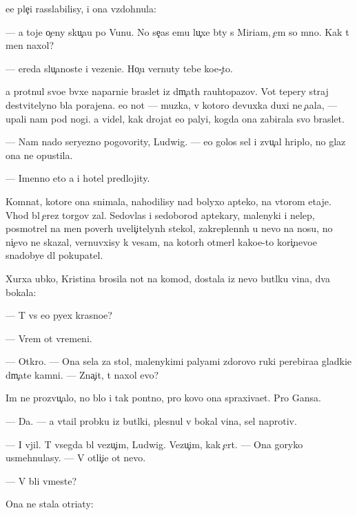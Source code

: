 \documentclass[10pt]{book}
\begin{document}
{\Y}ee ple{\c}i rasslabilisy, i ona vzdohnula:

— {\Y}a toje o{\c}eny sku{\c}a{\y}u po V{\y}unu. No se{\y}{\c}as {\y}emu lu{\c}xe b{\yi}ty s Miriam, {\c}em so mno{\y}. Kak t{\yi} men{\ia} naxol?

— {\C}ereda slu{\c}a{\y}noste{\y} i vezeni{\y}e. Ho{\c}u vernuty tebe ko{\y}e-{\c}to.

{\Y}a prot{\ia}nul svo{\y}e{\y} b{\yi}vxe{\y} naparni{\q}e braslet iz d{\yi}m{\c}at{\yi}h rauhtopazov. Vot tepery straj de{\y}stvitelyno b{\yi}la porajena. {\y}e{\y}o not{\yi} — muz{\yi}ka, v kotoro{\y} devuxka duxi ne {\c}a{\y}ala, — upali nam pod nogi. {\Y}a videl, kak drojat {\y}e{\y}o paly{\q}i, kogda ona zabirala svo{\y} braslet.

— Nam nado seryezno pogovority, Ludwig. — {\y}e{\y}o golos sel i zvu{\c}al hriplo, no glaz ona ne opustila.

— Imenno eto {\y}a i hotel predlojity.



Komnat{\yi}, kotor{\yi}{\y}e ona snimala, nahodilisy nad bolyxo{\y} apteko{\y}, na vtorom etaje. Vhod b{\yi}l {\c}erez torgov{\yi}{\y} zal. Sedovlas{\yi}{\y} i sedoborod{\yi}{\y} aptekary, malenyki{\y} i nelep{\yi}{\y}, posmotrel na men{\ia} poverh uveli{\c}itelyn{\yi}h stekol, zakreplenn{\yi}h u nevo na nosu, no ni{\c}evo ne skazal, vernuvxisy k vesam, na kotor{\yi}h otmer{\ia}l kako{\y}e-to kori{\c}nevo{\y}e snadobye dl{\ia} pokupatel{\ia}.

Xurxa {\y}ubko{\y}, Kristina brosila not{\yi} na komod, dostala iz nevo but{\yi}lku vina, dva bokala:

— T{\yi} vs{\e} {\y}e{\x}o pyex krasno{\y}e?

— Vrem{\ia} ot vremeni.

— Otkro{\y}. — Ona sela za stol, malenykimi paly{\q}ami zdorovo{\y} ruki perebira{\y}a gladki{\y}e d{\yi}m{\c}at{\yi}{\y}e kamni. — Zna{\c}it, t{\yi} naxol {\y}evo?

Im{\ia} ne prozvu{\c}alo, no b{\yi}lo i tak pon{\ia}tno, pro kovo ona spraxiva{\y}et. Pro Gansa.

— Da. — {\Y}a v{\yi}ta{\x}il probku iz but{\yi}lki, plesnul v bokal{\yi} vina, sel naprotiv.

— I v{\yi}jil. T{\yi} vsegda b{\yi}l vezu{\c}im, Ludwig. Vezu{\c}im, kak {\c}ert. — Ona goryko usmehnulasy. — V otli{\c}i{\y}e ot nevo.

— V{\yi} b{\yi}li vmeste?

Ona ne stala otri{\q}aty:
\end{document}
